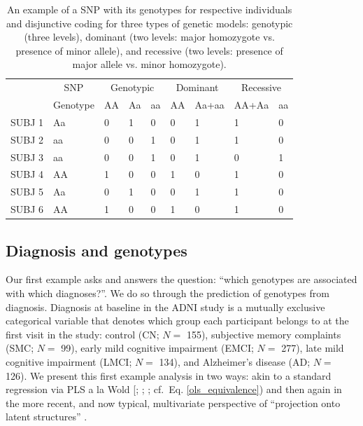 \documentclass[12pt]{article}
\begin{document}
\begin{table}[!h]

\caption{\label{tab:unnamed-chunk-2}\label{table:snps_models_disj} An example of a SNP with its genotypes for respective individuals and disjunctive coding for three types of genetic models: genotypic (three levels), dominant (two levels: major homozygote vs. presence of minor allele), and recessive (two levels: presence of major allele vs. minor homozygote).}
\centering
\begin{tabular}{lllllllll}
\toprule
\multicolumn{1}{c}{ } & \multicolumn{1}{c}{SNP} & \multicolumn{3}{c}{Genotypic} & \multicolumn{2}{c}{Dominant} & \multicolumn{2}{c}{Recessive} \\
\cmidrule(l{2pt}r{2pt}){2-2} \cmidrule(l{2pt}r{2pt}){3-5} \cmidrule(l{2pt}r{2pt}){6-7} \cmidrule(l{2pt}r{2pt}){8-9}
  & Genotype & AA & Aa & aa & AA & Aa+aa & AA+Aa & aa\\
\midrule
SUBJ 1 & Aa & 0 & 1 & 0 & 0 & 1 & 1 & 0\\
SUBJ 2 & aa & 0 & 0 & 1 & 0 & 1 & 1 & 0\\
SUBJ 3 & aa & 0 & 0 & 1 & 0 & 1 & 0 & 1\\
SUBJ 4 & AA & 1 & 0 & 0 & 1 & 0 & 1 & 0\\
SUBJ 5 & Aa & 0 & 1 & 0 & 0 & 1 & 1 & 0\\
\addlinespace
SUBJ 6 & AA & 1 & 0 & 0 & 1 & 0 & 1 & 0\\
\bottomrule
\end{tabular}
\end{table}

\hypertarget{diagnosis-and-genotypes}{%
\subsection{Diagnosis and genotypes}\label{diagnosis-and-genotypes}}

\label{section:plscarda}

Our first example asks and answers the question: ``which genotypes are
associated with which diagnoses?''. We do so through the prediction of
genotypes from diagnosis. Diagnosis at baseline in the ADNI study is a
mutually exclusive categorical variable that denotes which group each
participant belongs to at the first visit in the study: control (CN;
\(N=\) 155), subjective memory complaints (SMC; \(N=\) 99), early mild
cognitive impairment (EMCI; \(N=\) 277), late mild cognitive impairment
(LMCI; \(N=\) 134), and Alzheimer's disease (AD; \(N=\) 126). We present
this first example analysis in two ways: akin to a standard regression
via PLS a la Wold {[}\citet{wold_soft_1975};
\citet{wold_collinearity_1984}; \citet{wold_principal_1987}; cf.~Eq.
\ref{ols_equivalence}) and then again in the more recent, and now
typical, multivariate perspective of ``projection onto latent
structures'' \citep{abdi_partial_2010-1}.
\end{document}
